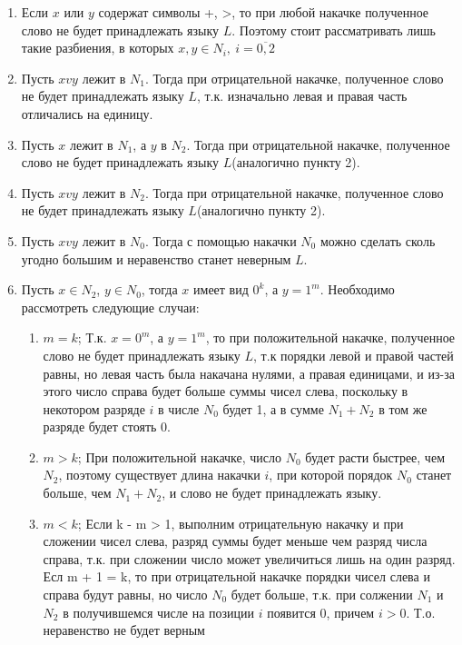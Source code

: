 \documentclass[a4paper, 14pt]{article}
\begin{document}
\begin{enumerate}

	\item{
			Если $x$ или $y$ содержат символы +, >, то при любой накачке полученное слово не будет принадлежать языку $L$. Поэтому стоит рассматривать лишь такие разбиения, в которых $x, y \in N_i, \ i=\overline{0,2}$
		}
    \item{
			Пусть $xvy$ лежит в $N_1$. Тогда при отрицательной накачке, полученное слово не будет принадлежать языку $L$, т.к. изначально левая и правая часть отличались на единицу.
		}
	\item{
			Пусть $x$ лежит в $N_1$, а $y$ в $N_2$. Тогда при отрицательной накачке, полученное слово не будет принадлежать языку $L$(аналогично пункту 2).
		}	
	\item{
			Пусть $xvy$ лежит в $N_2$. Тогда при отрицательной накачке, полученное слово не будет принадлежать языку $L$(аналогично пункту 2).
		}
	\item{
			Пусть $xvy$ лежит в $N_0$. Тогда с помощью накачки $N_0$ можно сделать сколь угодно большим и неравенство станет неверным $L$.
		}

	\item{
			Пусть $x \in N_2$, $y \in N_0$, тогда $x$ имеет вид $0^k$, а $y = 1^m$. Необходимо рассмотреть следующие случаи:
			
    \begin{enumerate}
		\item{ $m = k$; Т.к. $x = 0^m$, а $y = 1^m$, то при положительной накачке, полученное слово не будет принадлежать языку $L$, т.к порядки левой и правой частей равны,
			но левая часть была накачана нулями, а правая единицами, и из-за этого число справа будет больше суммы чисел слева, поскольку в некотором разряде $i$ в числе $N_0$ будет 1, а в сумме $N_1 + N_2$ в том же разряде будет стоять 0. 
			} 
		\item{ $m > k$; При положительной накачке, число $N_0$ будет расти быстрее, чем $N_2$, поэтому существует длина накачки $i$, при которой порядок $N_0$ станет больше, чем $N_1 + N_2$, и слово не будет принадлежать языку.} 
		\item{ $m < k$; Если k - m > 1, выполним отрицательную накачку и при сложении чисел слева, разряд суммы будет меньше чем разряд числа справа, т.к. при сложении число может увеличиться лишь на один разряд. Есл m + 1 = k, то при отрицательной накачке порядки чисел слева и справа будут равны, но число $N_0$ будет больше, т.к. при солжении $N_1$ и $N_2$ в получившемся числе на позиции $i$ появится 0, причем $i > 0$. Т.о. неравенство не будет верным} 
    \end{enumerate}
		}
\end{enumerate}
\end{document}
